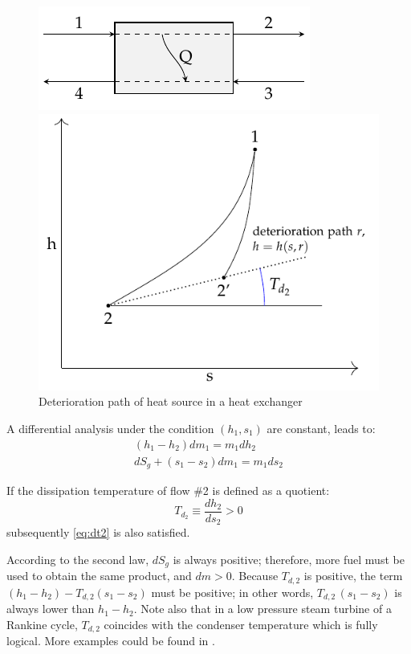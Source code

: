 \documentclass[energies,article,submit,moreauthors,pdftex]{Definitions/mdpi}
\begin{document}
\begin{figure}[ht]
	\begin{minipage}[c]{0.37\linewidth}
		\centering
		\includegraphics{heater}
	\end{minipage}
	\hskip0.9cm
	\begin{minipage}[c]{0.55\linewidth}
		\centering
		\includegraphics[scale=0.8]{dt2}
	\end{minipage}
	\caption{Deterioration path of heat source in a heat exchanger}
	\label{fig:dt2}
\end{figure}
A differential analysis under the condition $(h_1,s_1)$ are constant, leads to:
\begin{align}
\left(h_1 - h_2\right) dm_1 = m_1 dh_2 \\
dS_g + \left(s_1 - s_2\right) dm_1 =  m_1 ds_2
\end{align}

If the dissipation temperature of flow \#2 is defined as a quotient:
\[
	T_{d_2}\equiv \frac{dh_2}{ds_2}>0
\]
subsequently \cref{eq:dt2} is also satisfied.

According to the second law, $dS_g$ is always positive; therefore, more fuel must be used to obtain the same product, and $dm > 0$. Because $T_{d,2}$ is positive, the term $(h_1-h_2 )-T_{d,2} (s_1-s_2 )$ must be positive; in other words, $T_{d,2}\,(s_1-s_2)$ is always lower than $h_1-h_2$. Note also that in a low pressure steam turbine of a Rankine cycle, $T_{d,2}$ coincides with the condenser temperature which is fully logical. More examples could be found in \cite{Royo1995}.
\end{document}
